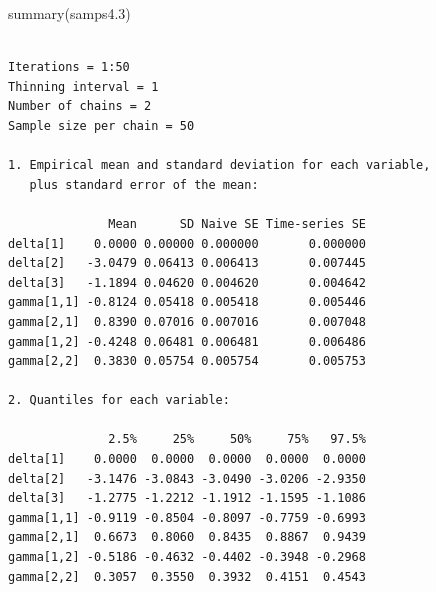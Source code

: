 \documentclass[
  letterpaper,
  DIV=11,
  numbers=noendperiod]{scrreprt}
\newenvironment{Shaded}{\begin{snugshade}}{\end{snugshade}}
\newcommand{\CommentTok}[1]{\textcolor[rgb]{0.37,0.37,0.37}{#1}}
\newcommand{\DecValTok}[1]{\textcolor[rgb]{0.68,0.00,0.00}{#1}}
\newcommand{\FloatTok}[1]{\textcolor[rgb]{0.68,0.00,0.00}{#1}}
\newcommand{\FunctionTok}[1]{\textcolor[rgb]{0.28,0.35,0.67}{#1}}
\newcommand{\NormalTok}[1]{\textcolor[rgb]{0.00,0.23,0.31}{#1}}
\newcommand{\OtherTok}[1]{\textcolor[rgb]{0.00,0.23,0.31}{#1}}
\newcommand{\SpecialCharTok}[1]{\textcolor[rgb]{0.37,0.37,0.37}{#1}}
\begin{document}
\begin{Shaded}
\begin{Highlighting}[]
\FunctionTok{summary}\NormalTok{(samps4}\FloatTok{.3}\NormalTok{)}
\end{Highlighting}
\end{Shaded}

\begin{verbatim}

Iterations = 1:50
Thinning interval = 1 
Number of chains = 2 
Sample size per chain = 50 

1. Empirical mean and standard deviation for each variable,
   plus standard error of the mean:

              Mean      SD Naive SE Time-series SE
delta[1]    0.0000 0.00000 0.000000       0.000000
delta[2]   -3.0479 0.06413 0.006413       0.007445
delta[3]   -1.1894 0.04620 0.004620       0.004642
gamma[1,1] -0.8124 0.05418 0.005418       0.005446
gamma[2,1]  0.8390 0.07016 0.007016       0.007048
gamma[1,2] -0.4248 0.06481 0.006481       0.006486
gamma[2,2]  0.3830 0.05754 0.005754       0.005753

2. Quantiles for each variable:

              2.5%     25%     50%     75%   97.5%
delta[1]    0.0000  0.0000  0.0000  0.0000  0.0000
delta[2]   -3.1476 -3.0843 -3.0490 -3.0206 -2.9350
delta[3]   -1.2775 -1.2212 -1.1912 -1.1595 -1.1086
gamma[1,1] -0.9119 -0.8504 -0.8097 -0.7759 -0.6993
gamma[2,1]  0.6673  0.8060  0.8435  0.8867  0.9439
gamma[1,2] -0.5186 -0.4632 -0.4402 -0.3948 -0.2968
gamma[2,2]  0.3057  0.3550  0.3932  0.4151  0.4543
\end{verbatim}

\begin{Shaded}
\end{Shaded}
\end{document}
